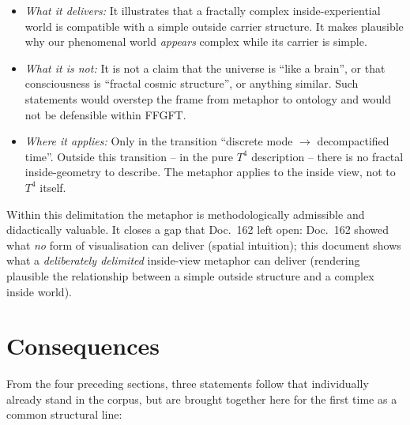 \begin{itemize}[leftmargin=2em,itemsep=2pt,topsep=2pt]
  \item \emph{What it delivers:} It illustrates that a fractally
        complex inside-experiential world is compatible with a
        simple outside carrier structure. It makes plausible why
        our phenomenal world \emph{appears} complex while its
        carrier is simple.
  \item \emph{What it is not:} It is not a claim that the universe
        is ``like a brain'', or that consciousness is ``fractal
        cosmic structure'', or anything similar. Such statements
        would overstep the frame from metaphor to ontology and
        would not be defensible within FFGFT.
  \item \emph{Where it applies:} Only in the transition ``discrete
        mode $\to$ decompactified time''. Outside this transition --
        in the pure $T^4$ description -- there is no fractal
        inside-geometry to describe. The metaphor applies to the
        inside view, not to $T^4$ itself.
\end{itemize}

Within this delimitation the metaphor is methodologically admissible
and didactically valuable. It closes a gap that Doc.~162 left open:
Doc.~162 showed what \emph{no} form of visualisation can deliver
(spatial intuition); this document shows what a \emph{deliberately
delimited} inside-view metaphor can deliver (rendering plausible the
relationship between a simple outside structure and a complex
inside world).

\section{Consequences}

From the four preceding sections, three statements follow that
individually already stand in the corpus, but are brought together
here for the first time as a common structural line:

